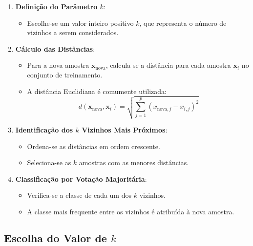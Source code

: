 \documentclass{sciposter}
\begin{document}
\begin{multicols}{3}
\begin{enumerate}
    \item \textbf{Definição do Parâmetro $k$}:
    \begin{itemize}
        \item Escolhe-se um valor inteiro positivo $k$, que representa o número de vizinhos a serem considerados.
    \end{itemize}
    \item \textbf{Cálculo das Distâncias}:
    \begin{itemize}
        \item Para a nova amostra $\mathbf{x}_{\text{nova}}$, calcula-se a distância para cada amostra $\mathbf{x}_i$ no conjunto de treinamento.
        \item A distância Euclidiana é comumente utilizada:
        \[
        d(\mathbf{x}_{\text{nova}}, \mathbf{x}_i) = \sqrt{\sum_{j=1}^{p} (x_{\text{nova},j} - x_{i,j})^2}
        \]
    \end{itemize}
    \item \textbf{Identificação dos $k$ Vizinhos Mais Próximos}:
    \begin{itemize}
        \item Ordena-se as distâncias em ordem crescente.
        \item Seleciona-se as $k$ amostras com as menores distâncias.
    \end{itemize}
    \item \textbf{Classificação por Votação Majoritária}:
    \begin{itemize}
        \item Verifica-se a classe de cada um dos $k$ vizinhos.
        \item A classe mais frequente entre os vizinhos é atribuída à nova amostra.
    \end{itemize}
\end{enumerate}

\subsection{Escolha do Valor de $k$}


\end{multicols}
\end{document}

